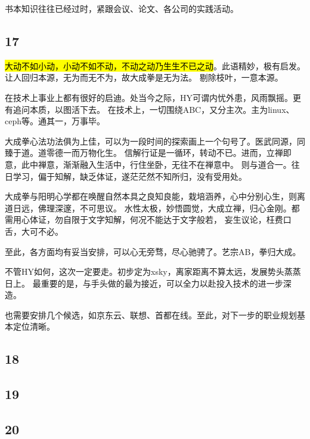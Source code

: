 书本知识往往已经过时，紧跟会议、论文、各公司的实践活动。

\subsection{17}

\hl{大动不如小动，小动不如不动，不动之动乃生生不已之动}。此语精妙，极有启发。让人回归本源，无为而无不为，故大成拳是无为法。
剔除枝叶，一意本源。

在技术上事业上都有很好的启迪。处当今之际，HY可谓内忧外患，风雨飘摇。更有追问本质，以图活下去。
在技术上，一切围绕ABC，又分主次。主为linux、ceph等。通其一，万事毕。

大成拳心法功法俱为上佳，可以为一段时间的探索画上一个句号了。医武同源，同臻于道。道零德一而万物化生。
信解行证是一循环，转动不已。进而，立禅即意，此中禅意，渐渐融入生活中，行住坐卧，无往不在禅意中。
则与道合一。往日学习，偏于知解，缺乏体证，遂茫茫然不知所归，没有受用处。

大成拳与阳明心学都在唤醒自然本具之良知良能，栽培涵养，心中分别心生，则离道日远，佛理深邃，不可思议。
水性太极，妙悟圆觉，大成立禅，归心金刚。都需用心体证，勿自限于文字知解，何况不能达于文字般若，
妄生议论，枉费口舌，大可不必。

至此，各方面均有妥当安排，可以心无旁骛，尽心驰骋了。艺宗AB，拳归大成。

不管HY如何，这次一定要走。初步定为xsky，离家距离不算太远，发展势头蒸蒸日上。
最重要的是，与手头做的最为接近，可以全力以赴投入技术的进一步深造。

也需要安排几个候选，如京东云、联想、首都在线。至此，对下一步的职业规划基本定位清晰。

\subsection{18}

\subsection{19}

\subsection{20}
